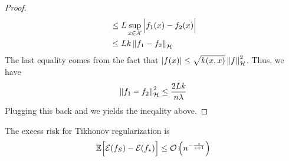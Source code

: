\begin{proof}
\begin{equation*}
\begin{aligned}
        &\le L\sup_{x\in\mathcal{X}}\Big| f_1(x) - f_2(x) \Big| \\
        &\le Lk\left\lVert f_1 - f_2\right\rVert_\mathcal{H}
    \end{aligned}
    \end{equation*}
    The last equality comes from the fact that $|f(x)| \le \sqrt{k(x, x)}\left\lVert f\right\rVert^2_\mathcal{H}$. Thus, we have 
    \begin{equation*}
        \left\lVert f_1-f_2\right\rVert^2_\mathcal{H} \le\frac{2Lk}{n\lambda}
    \end{equation*}
    Plugging this back and we yields the ineqality above.
\end{proof}

\begin{theorem}
    The excess risk for Tikhonov regularization is 
    \begin{equation*}
        \mathbb{E}\Big[ \mathcal{E}(f_S) - \mathcal{E}(f_*) \Big] \le \mathcal{O}\left( n^{-\frac{s}{s+1}} \right)
    \end{equation*}    
\end{theorem}
